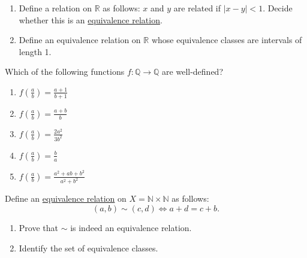   \begin{exercise}
    \begin{enumerate}
      \item[(a)] Define a relation on $\mathbb{R}$ as follows: $x$ and $y$ are related if $|x - y| < 1$. Decide whether this is an \hyperref[def:equivalence_relation]{equivalence relation}.
      \item[(b)] Define an equivalence relation on $\mathbb{R}$ whose equivalence classes are intervals of length 1.
    \end{enumerate}
  \end{exercise}

  \begin{exercise}
    Which of the following functions $f: \mathbb{Q} \to \mathbb{Q}$ are well-defined?
    \begin{enumerate}
      \item[(a)] $f(\frac{a}{b}) = \frac{a+1}{b+1}$
      \item[(b)] $f(\frac{a}{b}) = \frac{a+b}{b}$
      \item[(c)] $f(\frac{a}{b}) = \frac{2a^2}{3b^2}$
      \item[(d)] $f(\frac{a}{b}) = \frac{b}{a}$
      \item[(e)] $f(\frac{a}{b}) = \frac{a^2+ab+b^2}{a^2+b^2}$
    \end{enumerate}
  \end{exercise}

  \begin{exercise}
    Define an \hyperref[def:equivalence_relation]{equivalence relation} on $X = \mathbb{N} \times \mathbb{N}$ as follows:
    \begin{equation}
      (a, b) \sim (c, d) \Leftrightarrow a + d = c + b.
    \end{equation}
    \begin{enumerate}
      \item[(a)] Prove that $\sim$ is indeed an equivalence relation.
      \item[(b)] Identify the set of equivalence classes.
    \end{enumerate}
  \end{exercise}

